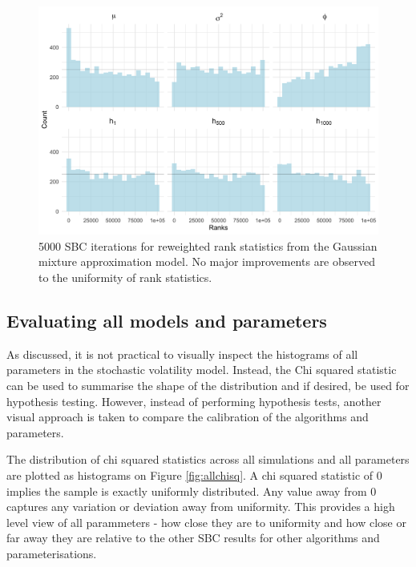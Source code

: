 \documentclass[12pt, a4paper]{article}
\begin{document}
    \begin{figure}[H]
        \centering
        \includegraphics[scale=0.1]{results/sir_cp_5k.png}
        \caption{5000 SBC iterations for reweighted rank statistics from the Gaussian mixture approximation model. No major improvements are observed to the uniformity of rank statistics.}
        \label{fig:reweight5k}
    \end{figure}

    \subsection{Evaluating all models and parameters}
    As discussed, it is not practical to visually inspect the histograms of all parameters in the stochastic volatility model. Instead, the Chi squared statistic can be used to summarise the shape of the distribution and if desired, be used for hypothesis testing. However, instead of performing hypothesis tests, another visual approach is taken to compare the calibration of the algorithms and parameters. 

    The distribution of chi squared statistics across all simulations and all parameters are plotted as histograms on Figure \ref{fig:allchisq}. A chi squared statistic of 0 implies the sample is exactly uniformly distributed. Any value away from 0 captures any variation or deviation away from uniformity. This provides a high level view of all parammeters - how close they are to uniformity and how close or far away they are relative to the other SBC results for other algorithms and parameterisations. 
\end{document}
